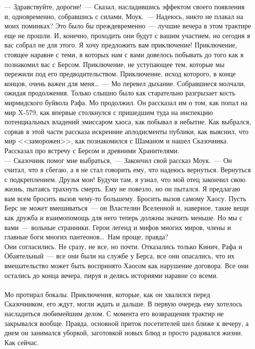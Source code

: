 \noindent --- Здравствуйте, дорогие!~--- Сказал, насладившись эффектом своего появления и, 
одновременно, собравшись с силами, Моук.~--- Надеюсь, никто не плакал на моих 
поминках? Это было бы преждевременно~--- лучшие вечера в этом трактире еще не 
прошли. И, конечно, проходить они будут с вашим участием, но сегодня я вас 
собрал не для этого. Я хочу предложить вам приключение! Приключение, стоящее 
наравне с теми, в которых нам с вами довелось побывать до того как я познакомил 
вас с Берсом. Приключение, не уступающее тем, которые мы пережили под его 
предводительством. Приключение, исход которого, в конце концов, очень важен для 
меня\ldots~--- Мо перевел дыхание. Собравшиеся молчали, ожидая продолжения. 
Только слышно было как старательно разгрызает кость мирмидского буйвола Рафа. Мо 
продолжил. Он рассказал им о том, как попал на мир X-579, как впервые 
столкнулся с пришедшим туда на инспекцию потенциальных владений эмиссаром хаоса, как 
побывал в небытие. Как выбрался, сорвав в этой части рассказа искренние 
аплодисменты публики, как выяснил, что мир <<заморожен>>, как познакомился с 
Шаманом и нашел Сказочника. Рассказал про встречу с Берсом и древними 
Хранителями.\\
--- Сказочник помог мне выбраться,~--- Закончил свой рассказ Моук.~--- Он считал, 
что я сбегаю, а я не стал говорить ему, что надеюсь вернуться. Вернуться с 
подкреплением. Друзья мои! Будучи там, я узнал, что мой отец закончил свою 
жизнь, пытаясь трахнуть смерть. Ему не повезло, но он пытался. Я предлагаю вам 
всем бросить вызов чему-то большему. Бросить вызов самому Хаосу. Пусть Берс не 
может вмешиваться~--- он Властелин Вселенной и, наверное, такие вещи как дружба 
и взаимопомощь для него теперь должны значить меньше. Но мы с вами~--- вольные 
странники. Герои легенд и мифов многих миров, члены и главные боги многих 
пантеонов\ldots\ Нам проще, правда?\\


Они согласились. Не сразу, не все, но почти. Отказались только Кинич, Рафа и 
Обаятельный~--- все они были на службе у Берса, все они опасались, что их 
вмешательство может быть воспринято Хаосом как нарушение договора. Все они 
остались до конца вечера, пируя и делясь историями наравне со всеми.\\
~\\


Мо протирал бокалы. Приключения, которые, как он хвалился перед Сказочником, 
его ждут, могли ждать и дальше. В первую очередь ему хотелось насладиться 
любимейшим делом. С момента его возвращения трактир не закрывался вообще. Правда, основной 
приток посетителей шел ближе к вечеру, а днем он занимался уборкой, заготовкой 
новых блюд и просто радовался жизни. Как сейчас.

